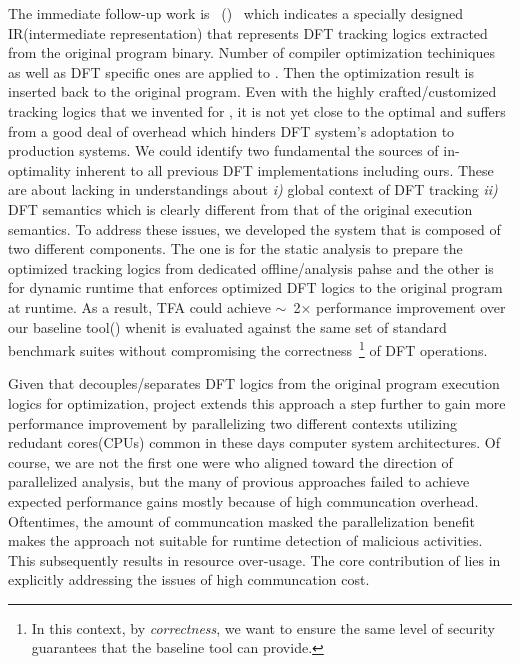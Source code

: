 \documentclass[letterpaper, 10pt]{article}
\begin{document}
\begin{small}
The immediate follow-up work is \TFAFull~(\TFA)~\cite{tfa:2012ndss} which
indicates a specially designed IR(intermediate representation) that represents
DFT tracking logics extracted from the original program binary.  Number of
compiler optimization techiniques as well as DFT specific ones are applied to
\TFA. Then the optimization result is inserted back to the original program. 
%
Even with the highly crafted/customized tracking logics that we invented for
\libdft, it is not yet close to the optimal and suffers from a good deal of
overhead which hinders DFT system's adoptation to production systems. We could
identify two fundamental the sources of in-optimality inherent to all
previous DFT implementations including ours. These are about lacking in
understandings about {\it i)} global context of DFT tracking {\it ii)} DFT
semantics which is clearly different from that of the original execution
semantics.
%
To address these issues, we developed the system that is composed of two
different components. The one is for the static analysis to prepare the
optimized tracking logics from dedicated offline/analysis pahse and the other
is for dynamic runtime that enforces optimized DFT logics to the original
program  at runtime.
%
As a result, TFA could achieve \(\sim\)~2\(\times\) performance improvement
over  our baseline tool(\libdft) whenit is evaluated against the same set of
standard benchmark suites without compromising the correctness~\footnote{In
        this context, by {\it correctness}, we want to ensure the same level of
security guarantees that the baseline tool \libdft can provide.} of DFT
operations.

Given that \TFA decouples/separates DFT logics from the original program
execution logics for optimization, \SR project extends this approach a step
further to gain more performance improvement by parallelizing two different
contexts utilizing redudant cores(CPUs) common in these days computer system
architectures. Of course, we are not the first one were who aligned toward the
direction of parallelized analysis, but the many of provious approaches failed
to achieve expected performance gains mostly because of high communcation
overhead. Oftentimes, the amount of communcation masked the parallelization
benefit makes the approach not suitable for runtime detection of malicious
activities. This subsequently results in resource over-usage.
%
The core contribution of \SR lies in explicitly addressing the issues of high
communcation cost.


\end{small}
\end{document}
